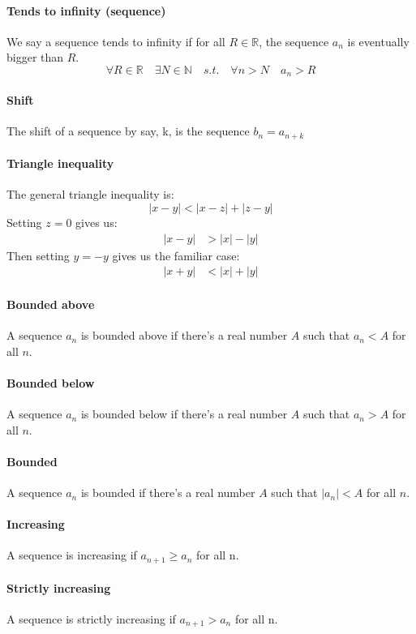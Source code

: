 \documentclass{article}
\newcommand{\R}{\mathbb{R}}
\newcommand{\N}{\mathbb{N}}
\begin{document}
\paragraph{Tends to infinity (sequence)}
We say a sequence tends to infinity if for all $ R \in \R $, the sequence $ a_{n} $ is eventually bigger than $ R $.
\begin{equation}
\forall R \in \R \quad \exists N \in \N \quad s.t. \quad \forall n > N \quad a_{n} > R
\end{equation}
\paragraph{Shift}
The shift of a sequence by say, k, is the sequence $ b_{n} = a_{n + k} $
\paragraph{Triangle inequality}
The general triangle inequality is:
\begin{equation}
|x - y| < |x - z| + |z - y|
\end{equation}
Setting $ z = 0 $ gives us:
\begin{align}
|x - y| & > |x| - |y|
\end{align}
Then setting $ y = - y $ gives us the familiar case:
\begin{align}
|x + y| & < |x| + |y|
\end{align}
\paragraph{Bounded above}
A sequence $ a_{n} $ is bounded above if there's a real number $ A $ such that $ a_{n} < A $ for all $ n $.
\paragraph{Bounded below}
A sequence $ a_{n} $ is bounded below if there's a real number $ A $ such that $ a_{n} > A $ for all $ n $.
\paragraph{Bounded}
A sequence $ a_{n} $ is bounded if there's a real number $ A $ such that $ |a_{n}| < A $ for all $ n $.
\paragraph{Increasing}
A sequence is increasing if $ a_{n + 1} \geq a_{n} $ for all n.
\paragraph{Strictly increasing}
A sequence is strictly increasing if $ a_{n + 1} > a_{n} $ for all n.
\end{document}
